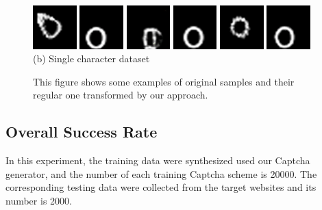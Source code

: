 \begin{figure}
{\begin{minipage}[t]{0.45\textwidth}
        \includegraphics[width=0.15\textwidth]{fig/experiment_onechar/o-1.png}
        \includegraphics[width=0.15\textwidth]{fig/experiment_onechar/o-2.png}
        \includegraphics[width=0.15\textwidth]{fig/experiment_onechar/o-7.png}
        \includegraphics[width=0.15\textwidth]{fig/experiment_onechar/o-8.png}
        \includegraphics[width=0.15\textwidth]{fig/experiment_onechar/o-13.png}
        \includegraphics[width=0.15\textwidth]{fig/experiment_onechar/o-14.png} \\
        \centering (b) Single character dataset
    \end{minipage}
    }
  \caption{This figure shows some examples of original samples and their regular one transformed by our approach.}
  \label{fig: mnist_show}
\end{figure}

\subsection{Overall Success Rate}
In this experiment, the training data were synthesized used our Captcha generator, and the number of each training Captcha scheme is 20000. The corresponding testing data were collected from the target websites and its number is 2000.
